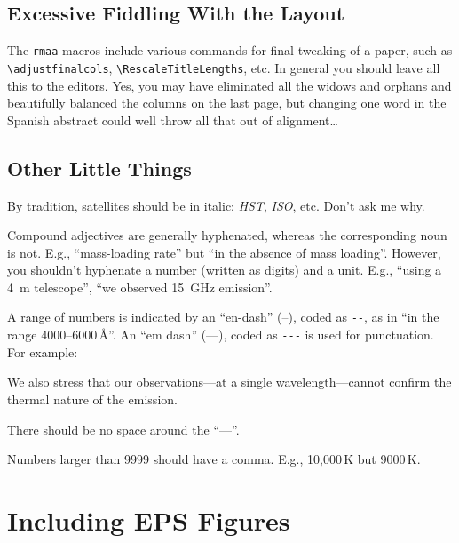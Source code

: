 \documentclass[preprint]{rmxac}
\newcommand{\CS}[1]{\texttt{\textbackslash #1}}
\newenvironment{Example}
{\begin{list}{}{\setlength{\leftmargin}{5pt}\setlength{\rightmargin}{5pt}}\item[]}
  {\end{list}}
\begin{document}
\subsection{Excessive Fiddling With the Layout }
\label{sec:fiddling}

The \texttt{rmaa} macros include various commands for final tweaking
of a paper, such as \CS{adjustfinalcols}, \CS{RescaleTitleLengths},
etc. In general you should leave all this to the editors. Yes, you may
have eliminated all the widows and orphans and beautifully balanced the
columns on the last page, but changing one word in the Spanish
abstract could well throw all that out of alignment\dots


\subsection{Other Little Things}
\label{sec:little}

By tradition, satellites should be in italic: \textit{HST},
\textit{ISO}, etc. Don't ask me why. 

Compound adjectives are generally hyphenated, whereas the
corresponding noun is not. E.g., ``mass-loading rate'' but ``in the
absence of mass loading''. However, you shouldn't hyphenate a number
(written as digits) and a unit. E.g., ``using a 4~m telescope'', ``we
observed 15~GHz emission''. 

A range of numbers is indicated by an ``en-dash'' (--), coded as
\verb+--+, as in ``in the range 4000--6000\,\AA''. An ``em dash''
(---), coded as \verb+---+ is used for punctuation. For example: 
\begin{Example}
  We also stress that our observations---at a single
  wavelength---cannot confirm the thermal nature of the emission.
\end{Example}
There should be  no space around the ``---''. 

Numbers larger than 9999 should have a comma. E.g., 10,000\,K but
9000\,K\@.

\section{Including EPS Figures}
\label{sec:EPS}
\end{document}
